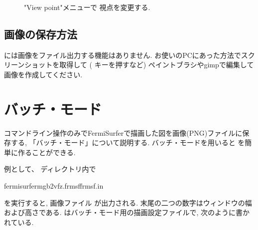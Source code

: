 \documentclass[letterpaper,10pt,dvipdfmx,openany]{sphinxmanual}
\let\sphinxpxdimen\pdfpxdimen\else\newdimen\sphinxpxdimen
\begin{document}
\begin{figure}[htbp]
\centering
\capstart

\noindent\sphinxincludegraphics[width=300\sphinxpxdimen]{{setview}.png}
\caption{"View point"メニューで 視点を変更する.}\label{\detokenize{ops:id25}}\label{\detokenize{ops:setviewpng}}\end{figure}


\section{画像の保存方法}
\label{\detokenize{ops:id14}}
\sphinxAtStartPar
{} には画像をファイル出力する機能はありません.
お使いのPCにあった方法でスクリーンショットを取得して
( キーを押すなど)
ペイントブラシやgimpで編集して画像を作成してください.

\sphinxstepscope


\chapter{バッチ・モード}
\label{\detokenize{batch:id1}}\label{\detokenize{batch::doc}}
\sphinxAtStartPar
コマンドライン操作のみでFermiSurferで描画した図を画像(PNG)ファイルに保存する,
「バッチ・モード」について説明する.
バッチ・モードを用いると
を簡単に作ることができる.

\sphinxAtStartPar
例として、  ディレクトリ内で

\begin{sphinxVerbatim}[commandchars=\\\{\}]
\PYGZdl{}fermisurfermgb2\PYGZus{}vfz.frmsffrmsf.in
\end{sphinxVerbatim}

\sphinxAtStartPar
を実行すると, 画像ファイル  が出力される.
末尾の二つの数字はウィンドウの幅および高さである.
 はバッチ・モード用の描画設定ファイルで,
次のように書かれている.
\end{document}
